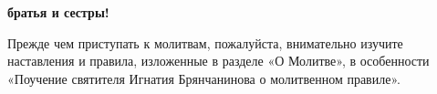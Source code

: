 \vspace*{3cm}

\begin{center}

\textbf{ братья и сестры!}

Прежде чем приступать к молитвам,
пожалуйста, внимательно изучите
наставления и правила, изложенные в
разделе «О Молитве», в особенности
«Поучение святителя Игнатия
Брянчанинова о молитвенном правиле».

\end{center}

